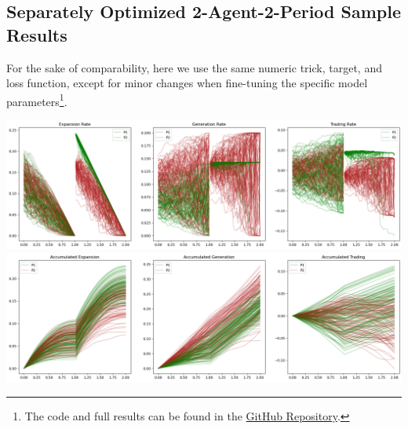 \documentclass[a4paper,10pt]{article}
\newcommand{\1}{\mathbf{1}}
\begin{document}
\subsection{Separately Optimized 2-Agent-2-Period Sample Results}

For the sake of comparability, here we use the same numeric trick, target, and loss function, except for minor changes when fine-tuning the specific model parameters\footnote{The code and full results can be found in the \href{https://github.com/OrangeAoo/PA-MFG-FBSDE/blob/FBSDE/2Period/Separate_Optim_1Prdx2/Adamax_clamp_sig_MSE.ipynb}{GitHub Repository}.}.


\begin{center}
  \begin{minipage}[ht]{0.9\textwidth}
    \centering
    \includegraphics[]{FinalReports/Illustration_diagrams/Seprt-2A2P-Sigmoid-ResExamples/Rates.png}\\
    \includegraphics[]{FinalReports/Illustration_diagrams/Seprt-2A2P-Sigmoid-ResExamples/AccumRates.png}\\
    \label{fig:decomp-gen-sep}
  \end{minipage}
  

\end{center}
\end{document}
